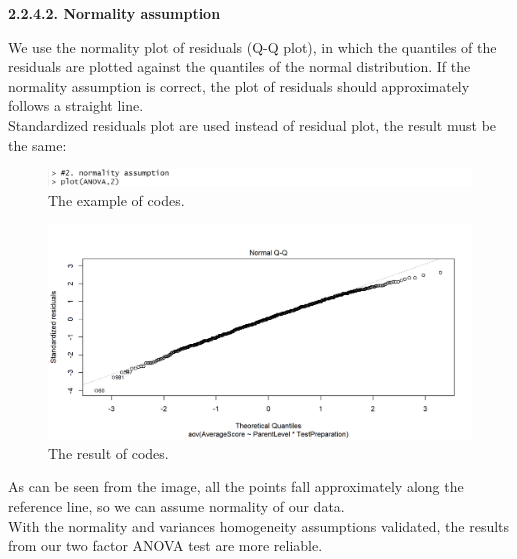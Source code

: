 \documentclass[a4paper]{article}
\begin{document}

\vspace{0.4cm}
\textbf{2.2.4.2. Normality assumption} \\ \newline
{}
We use the normality plot of residuals (Q-Q plot), in which the quantiles of the residuals are
plotted against the quantiles of the normal distribution. If the normality assumption is correct, the plot of residuals should approximately follows a straight line. \\ \newline
Standardized residuals plot are used instead of residual plot, the result must be the same:
\begin{figure}[H]
    \centering
    \includegraphics[scale = 0.7]{Images/Activity2/25.png}
    \caption{The example of codes.}
    \label{fig:model3}
\end{figure}
\begin{figure}[H]
    \centering
    \includegraphics[scale = 0.7]{Images/Activity2/26.png}
    \caption{The result of codes.}
    \label{fig:model3}
\end{figure}
As can be seen from the image, all the points fall approximately along the reference line, so we can assume normality of our data. \\ \newline
With the normality and variances homogeneity assumptions validated, the results from our two factor ANOVA test are more reliable.

\end{document}

